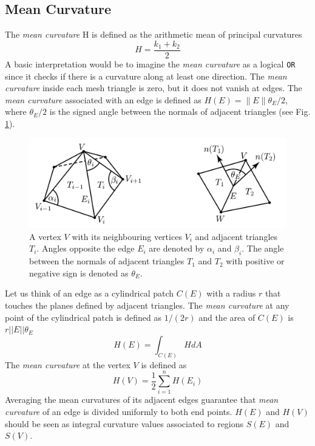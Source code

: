 \subsection{Mean Curvature}
The \textit{mean curvature} H is defined as the arithmetic mean of principal curvatures $$H = \frac{k_1 + k_2}{2}$$  A basic interpretation would be to imagine the \textit{mean curvature} as a logical \texttt{OR} since it checks if there is a curvature along at least one direction.\cite{WEBSITE:gaussiancurvaturedirty}
The \textit{mean curvature} inside each mesh triangle is zero, but it does not vanish at edges. The \textit{mean curvature} associated with an edge is defined as $H(E) = \parallel E \parallel {\theta}_E/2$, where ${\theta}_E/2$ is the signed
angle between the normals of adjacent triangles (see Fig. \ref{fig:mean-curvature}).

\begin{figure}[h]
  \centering
\includegraphics[scale=0.4]{images/mean_curvature_paper.png}
\caption{A vertex $V$ with its neighbouring vertices $V_i$ and adjacent triangles $T_i$. Angles opposite the edge $E_i$ are denoted by $\alpha_i$ and $\beta_i$. The
angle between the normals of adjacent triangles $T_1$ and $T_2$ with positive or negative sign is denoted as ${\theta}_E$. \cite{geometryprocessing}}\label{fig:mean-curvature}
\end{figure}
Let us think of an edge as a cylindrical patch $C(E)$ with a radius $r$ that touches the planes defined by adjacent triangles. The \textit{mean curvature} at any point of the cylindrical patch is defined as $1/(2r)$ and the area of $C(E)$ is $r||E||\theta_E$
$$H(E) = \int_{C(E)} HdA$$
The \textit{mean curvature} at the vertex $V$ is defined as $$H(V) = \frac{1}{2} \sum_{i=1}^n H(E_i)$$ Averaging the mean curvatures of its adjacent edges guarantee that \textit{mean curvature} of an edge is divided uniformly to both end points. $H(E)$ and $H(V)$ should be seen as integral curvature values associated to regions $S(E)$ and $S(V)$.
\cite{geometryprocessing}


